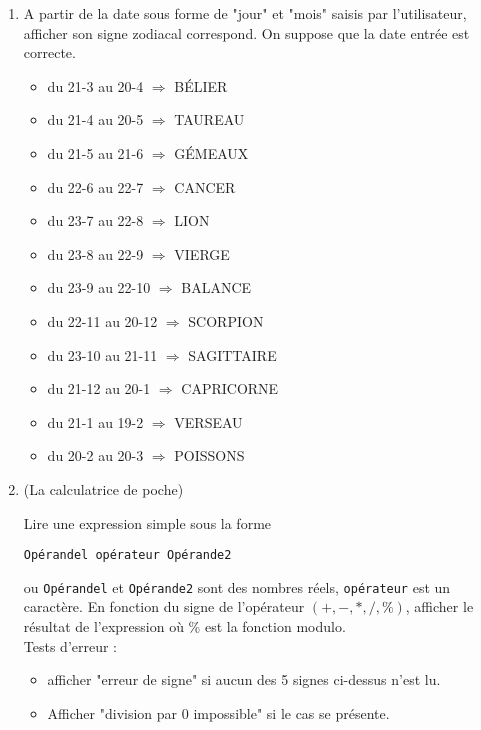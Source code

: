 \documentclass[a4paper]{article}
\begin{document}
\begin{enumerate}
\item A partir de la date sous forme de "jour" et "mois" saisis par l'utilisateur, afficher son signe zodiacal correspond. On suppose que la date entrée est correcte.

\begin{itemize}
\item  du 21-3 au 20-4 $\Longrightarrow$ BÉLIER
\item  du 21-4 au 20-5  $\Longrightarrow$ TAUREAU
\item  du 21-5 au 21-6  $\Longrightarrow$ GÉMEAUX
\item  du 22-6 au 22-7  $\Longrightarrow$ CANCER
\item  du 23-7 au 22-8  $\Longrightarrow$ LION
\item  du 23-8 au 22-9  $\Longrightarrow$ VIERGE
\item  du 23-9 au 22-10  $\Longrightarrow$ BALANCE
\item  du 22-11 au 20-12  $\Longrightarrow$ SCORPION
\item  du 23-10 au 21-11  $\Longrightarrow$ SAGITTAIRE
\item  du 21-12 au 20-1  $\Longrightarrow$ CAPRICORNE
\item  du 21-1 au 19-2  $\Longrightarrow$ VERSEAU
\item  du 20-2 au 20-3  $\Longrightarrow$ POISSONS
\end{itemize}


\item (La calculatrice de poche)

Lire une expression simple sous la forme

{\tt Opérandel opérateur Opérande2}

ou {\tt Opérandel} et {\tt Opérande2} sont des nombres réels, {\tt opérateur} est un caractère.
En fonction du signe de l'opérateur $(+,-,*,/,\%)$, afficher le résultat de l'expression où \% est la fonction modulo.\\
Tests d'erreur :

\begin{itemize}
\item  afficher "erreur de signe" si aucun des 5 signes ci-dessus n'est lu.
\item Afficher "division par 0 impossible" si le cas se présente.
\end{itemize}
\end{enumerate}
\end{document}
